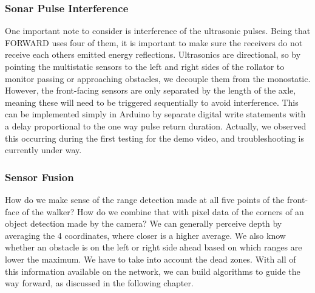 \subsubsection{Sonar Pulse Interference}
\noindent One important note to consider is interference of the ultrasonic pulses. Being that FORWARD uses four of them, it is important to make sure the receivers do not receive each others emitted energy reflections. Ultrasonics are directional, so by pointing the multistatic sensors to the left and right sides of the rollator to monitor passing or approaching obstacles, we decouple them from the monostatic. However, the front-facing sensors are only separated by the length of the axle, meaning these will need to be triggered sequentially to avoid interference. This can be implemented simply in Arduino by separate digital write statements with a delay proportional to the one way pulse return duration. Actually, we observed this occurring during the first testing for the demo video, and troubleshooting is currently under way.\\

\subsubsection{Sensor Fusion}
\noindent How do we make sense of the range detection made at all five points of the front-face of the walker? How do we combine that with pixel data of the corners of an object detection made by the camera? We can generally perceive depth by averaging the 4 coordinates, where closer is a higher average. We also know whether an obstacle is on the left or right side ahead based on which ranges are lower the maximum. We have to take into account the dead zones. With all of this information available on the network, we can build algorithms to guide the way forward, as discussed in the following chapter.\\


